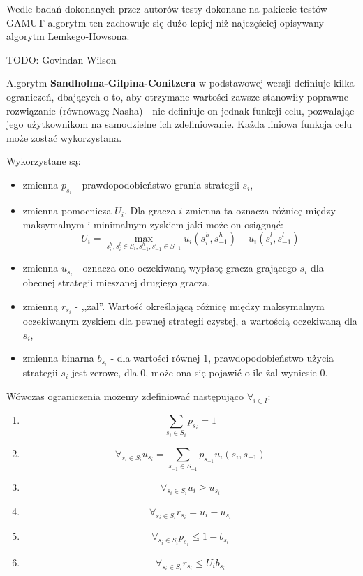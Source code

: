 \documentclass[polish]{standalone}
\begin{document}
Wedle badań dokonanych przez autorów testy dokonane na pakiecie testów GAMUT algorytm ten zachowuje się dużo lepiej niż
najczęściej opisywany algorytm Lemkego-Howsona.

TODO: Govindan-Wilson

Algorytm \textbf{Sandholma-Gilpina-Conitzera} w podstawowej wersji definiuje kilka ograniczeń, dbających o to, aby 
otrzymane wartości zawsze stanowiły poprawne rozwiązanie (równowagę Nasha) - nie definiuje on jednak funkcji celu,
pozwalając jego użytkownikom na samodzielne ich zdefiniowanie. Każda liniowa funkcja celu może zostać wykorzystana.

Wykorzystane są: 
\begin{itemize}
\item zmienna $p_{s_i}$ - prawdopodobieństwo grania strategii $s_i$,
\item zmienna pomocnicza $U_i$. Dla gracza $i$ zmienna ta oznacza różnicę między maksymalnym i minimalnym zyskiem jaki
może on osiągnąć:
$$U_i = \max_{s_i^h, s_i^l \in S_i, s_{-1}^h, s_{-1}^l \in S_{-1}} u_i(s_i^h, s_{-1}^h) - u_i(s_i^l, s_{-1}^l)$$
\item zmienna $u_{s_i}$ - oznacza ono oczekiwaną wypłatę gracza grającego $s_i$ dla obecnej strategii mieszanej drugiego
gracza,
\item zmienną $r_{s_i}$ - ,,żal''. Wartość określającą różnicę między maksymalnym oczekiwanym zyskiem dla pewnej
strategii czystej, a wartością oczekiwaną dla $s_i$,
\item zmienna binarna $b_{s_i}$ - dla wartości równej $1$, prawdopodobieństwo użycia strategii $s_i$ jest zerowe,
dla $0$, może ona się pojawić o ile żal wyniesie $0$.
\end{itemize}

Wówczas ograniczenia możemy zdefiniować następująco $\forall_{i \in I}$:
\begin{enumerate}
\item $$\sum_{{s_i} \in S_i} p_{s_i} = 1$$
\item $$\forall_{s_i \in S_i} u_{s_i} = \sum_{s_{-1} \in S_{-1}} p_{s_{-1}} u_i(s_i, s_{-1})$$
\item $$\forall_{s_i \in S_i} u_i \geq u_{s_i}$$
\item $$\forall_{s_i \in S_i} r_{s_i} = u_i - u_{s_i}$$
\item $$\forall_{s_i \in S_i} p_{s_i} \leq 1-b_{s_i}$$
\item $$\forall_{s_i \in S_i} r_{s_i} \leq U_i b_{s_i}$$
\end{enumerate}
\end{document}
